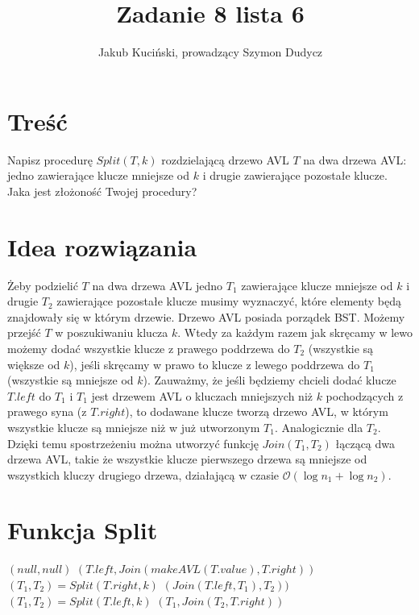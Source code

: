 \documentclass{article}
\title{Zadanie 8 lista 6}
\author{Jakub Kuciński, prowadzący Szymon Dudycz}
\begin{document}
\maketitle

\section{Treść}
Napisz procedurę $Split(T,k)$ rozdzielającą drzewo AVL $T$ na dwa drzewa AVL: jedno zawierające klucze mniejsze od $k$ i drugie zawierające pozostałe klucze. Jaka jest złożoność Twojej procedury?

\section{Idea rozwiązania}
Żeby podzielić $T$ na dwa drzewa AVL jedno $T_1$ zawierające klucze mniejsze od $k$ i drugie $T_2$ zawierające pozostałe klucze musimy wyznaczyć, które elementy będą znajdowały się w którym drzewie. Drzewo AVL posiada porządek BST. Możemy przejść $T$ w poszukiwaniu klucza $k$. Wtedy za każdym razem jak skręcamy w lewo możemy dodać wszystkie klucze z prawego poddrzewa do $T_2$ (wszystkie są większe od $k$), jeśli skręcamy w prawo to klucze z lewego poddrzewa do $T_1$ (wszystkie są mniejsze od $k$). Zauważmy, że jeśli będziemy chcieli dodać klucze $T.left$ do $T_1$ i $T_1$ jest drzewem AVL o kluczach mniejszych niż $k$ pochodzących z prawego syna (z $T.right$), to dodawane klucze tworzą drzewo AVL, w którym wszystkie klucze są mniejsze niż w już utworzonym $T_1$. Analogicznie dla $T_2$. Dzięki temu spostrzeżeniu można utworzyć funkcję $Join(T_1, T_2)$ łączącą dwa drzewa AVL, takie że wszystkie klucze pierwszego drzewa są mniejsze od wszystkich kluczy drugiego drzewa, działającą w czasie $\mathcal{O}(\log{n_1} + \log{n_2})$.

\section{Funkcja Split}
\begin{algorithm}
\caption{$Split(T, k)$}
\begin{algorithmic}[1]
    \State \Return $(null, null)$
\EndIf 
{}
    \State \Return $(T.left, Join(makeAVL(T.value), T.right))$
\EndIf
{}
    \State $(T_1, T_2) = Split(T.right, k)$
    \State \Return $(Join(T.left, T_1),T_2))$
\EndIf
\State $(T_1, T_2) = Split(T.left, k)$
\State \Return $(T_1, Join(T_2, T.right))$
\end{algorithmic}
\end{algorithm}
\pagebreak
\end{document}
